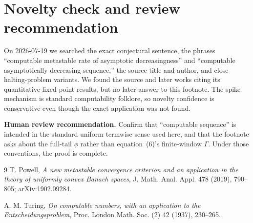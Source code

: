 \documentclass[10pt]{article}
\begin{document}
\section*{Novelty check and review recommendation}

On 2026-07-19 we searched the exact conjectural sentence, the phrases
``computable metastable rate of asymptotic decreasingness'' and
``computable asymptotically decreasing sequence,'' the source title and
author, and close halting-problem variants.  We found the source and later
works citing its quantitative fixed-point results, but no later answer to this
footnote.  The spike mechanism is standard computability folklore, so novelty
confidence is conservative even though the exact application was not found.

\textbf{Human review recommendation.} Confirm that ``computable sequence'' is
intended in the standard uniform termwise sense used here, and that the
footnote asks about the full-tail $\phi$ rather than equation~(6)'s
finite-window $\Gamma$.  Under those conventions, the proof is complete.

\begin{thebibliography}{9}
T. Powell,
\emph{A new metastable convergence criterion and an application in the theory
of uniformly convex Banach spaces},
J. Math. Anal. Appl. 478 (2019), 790--805;
\href{https://arxiv.org/abs/1902.09284}{arXiv:1902.09284}.

A. M. Turing,
\emph{On computable numbers, with an application to the
Entscheidungsproblem},
Proc. London Math. Soc. (2) 42 (1937), 230--265.
\end{thebibliography}
\end{document}
